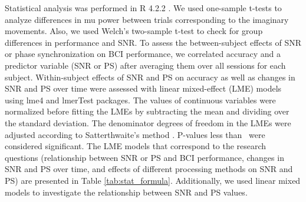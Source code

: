 Statistical analysis was performed in R 4.2.2 \citep{R_Core}. We used one-sample t-tests to analyze differences in mu power between trials corresponding to the imaginary movements. Also, we used Welch's two-sample t-test to check for group differences in performance and SNR. To assess the between-subject effects of SNR or phase synchronization on BCI performance, we correlated accuracy and a predictor variable (SNR or PS) after averaging them over all sessions for each subject. Within-subject effects of SNR and PS on accuracy as well as changes in SNR and PS over time were assessed with linear mixed-effect (LME) models using lme4 \citep{R_lme4} and lmerTest \citep{R_lmerTest} packages. The values of continuous variables were normalized before fitting the LMEs by subtracting the mean and dividing over the standard deviation. The denominator degrees of freedom in the LMEs were adjusted according to Satterthwaite's method \citep{Satterthwaite1946}. P-values less than \pSignificant~were considered significant. The LME models that correspond to the research questions (relationship between SNR or PS and BCI performance, changes in SNR and PS over time, and effects of different processing methods on SNR and PS) are presented in Table \ref{tab:stat_formula}. Additionally, we used linear mixed models to investigate the relationship between SNR and PS values.

